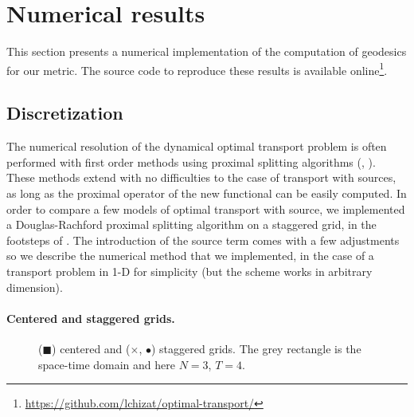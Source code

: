 
\section{Numerical results}
\label{sec-numerics}

This section presents a numerical implementation of the computation of geodesics for our metric. The source code to reproduce these results is available online\footnote{\url{https://github.com/lchizat/optimal-transport/}}.

\subsection{Discretization}

The numerical resolution of the dynamical optimal transport problem is often performed with first order methods using proximal splitting algorithms (\cite{benamou2000computational}, \cite{papadakis2014optimal}).  These methods extend with no difficulties to the case of transport with sources, as long as the proximal operator of the new functional can be easily computed. In order to compare a few models of optimal transport with source, we implemented a Douglas-Rachford proximal splitting algorithm on a staggered grid, in the footsteps of \cite{papadakis2014optimal}. The introduction of the source term comes with a few adjustments so we describe the numerical method that we implemented, in the case of a transport problem in 1-D for simplicity (but the scheme works in arbitrary dimension).

\paragraph{Centered and staggered grids.}

\begin{figure}
 \centering
\caption{($\blacksquare$) centered and ($\times$, $\bullet$) staggered grids. The grey rectangle is the space-time domain and here $N=3$, $T=4$.}
\label{fig: grids}
\end{figure}


